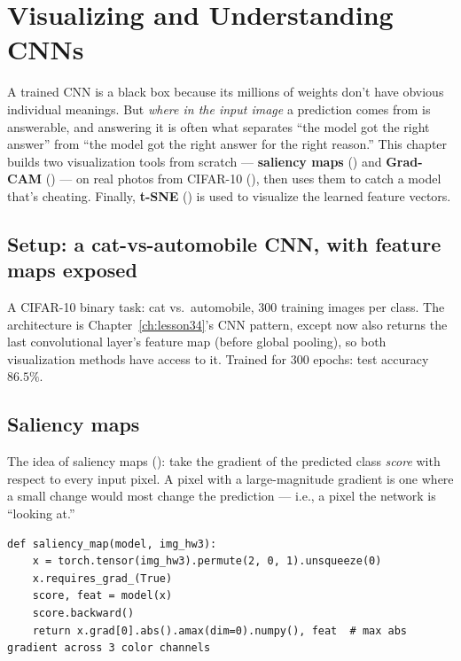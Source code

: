 \chapter{Visualizing and Understanding CNNs}
\label{ch:lesson39}

A trained CNN is a black box because its millions of weights don't have obvious individual meanings. But \emph{where in the input image} a prediction comes from is answerable, and answering it is often what separates ``the model got the right answer'' from ``the model got the right answer for the right reason.'' This chapter builds two visualization tools from scratch --- \textbf{saliency maps} () and \textbf{Grad-CAM} () --- on real photos from CIFAR-10 (), then uses them to catch a model that's cheating. Finally, \textbf{t-SNE} () is used to visualize the learned feature vectors.

\section{Setup: a cat-vs-automobile CNN, with feature maps exposed}

A CIFAR-10 binary task: cat vs.\ automobile, 300 training images per class. The architecture is Chapter~\ref{ch:lesson34}'s CNN pattern, except  now also returns the last convolutional layer's feature map (before global pooling), so both visualization methods have access to it. Trained for 300 epochs: test accuracy $86.5\%$.

\section{Saliency maps}

The idea of saliency maps (): take the gradient of the predicted class \emph{score} with respect to every input pixel. A pixel with a large-magnitude gradient is one where a small change would most change the prediction --- i.e., a pixel the network is ``looking at.''

\begin{lstlisting}
def saliency_map(model, img_hw3):
    x = torch.tensor(img_hw3).permute(2, 0, 1).unsqueeze(0)
    x.requires_grad_(True)
    score, feat = model(x)
    score.backward()
    return x.grad[0].abs().amax(dim=0).numpy(), feat  # max abs gradient across 3 color channels
\end{lstlisting}

